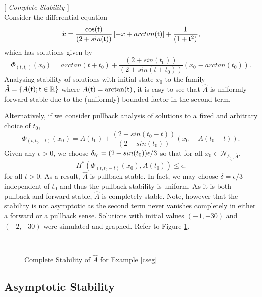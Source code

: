 \begin{eg} \label{cseg} [ {\em Complete Stability} ] \hfill \\
  Consider the differential equation
  \begin{equation}
  \dot{x} = \frac{\cos( \mathsf{\mathsf{t}})}{(2+sin( \mathsf{\mathsf{t}}))} \left[ -x + arctan( \mathsf{\mathsf{t}}) \right] +
  \frac{1}{(1 +  \mathsf{\mathsf{t}}^2)},
  \end{equation}
  which has solutions given by
  \[ \Phi_{(t,t_0)}(x_0) = arctan(t + t_0) + \frac{(2 + sin(t_0))}{(2 +
                         sin(t+t_0))}(x_0 - arctan(t_0)). \]
  Analysing stability of solutions with initial state $x_0$ to
  the family $\hat{A} = \{ A( \mathsf{\mathsf{t}}) ;  \mathsf{\mathsf{t}} \in \mathbb{R}  \}$ where $A( \mathsf{\mathsf{t}}) =
  \arctan( \mathsf{\mathsf{t}})$, it is easy to see that $\hat{A}$ is uniformly forward
  stable due to the (uniformly) bounded factor in the second term.

  Alternatively, if we consider pullback analysis of solutions to a fixed and
  arbitrary choice of $t_0$,
  \[ \Phi_{(t,t_0-t)}(x_0) = A(t_0) + \frac{(2 + sin(t_0-t))}{(2 +
                         sin(t_0))}(x_0 - A(t_0-t)). \]
  Given any $\epsilon > 0$, we choose $\delta_{t_0} = (2 +
  sin(t_0)) \epsilon / 3$ so that for all $x_0 \in
  \mathcal{N}_{\delta_{t_0},\hat{A}}$,
  \[ H^*(\Phi_{(t, t_0-t)}(x_0), A(t_0)) \leq \epsilon. \]
  for all $t>0$.
  As a result, $\hat{A}$ is pullback stable. In fact, we may choose $\delta =
  \epsilon/3$ independent of $t_0$ and thus the pullback stability
  is uniform. As it is both pullback and forward stable, $\hat{A}$ is
  completely stable. Note, however that the stability is not
  asymptotic as the second term never vanishes completely  in either
  a forward or a pullback sense. Solutions with initial values  
  $(-1,-30)$ and $(-2,-30)$ were simulated and graphed. Refer to Figure \ref{csegpic}.
\end{eg}

\begin{figure}[htb]
\begin{center}
\leavevmode
\hbox{
\epsfxsize=10.0cm
  }%
\protect\caption{Complete Stability of $\hat{A}$ for Example
\ref{cseg}}
        \protect\label{csegpic}
\end{center}
\end{figure}

\subsection{Asymptotic Stability}

